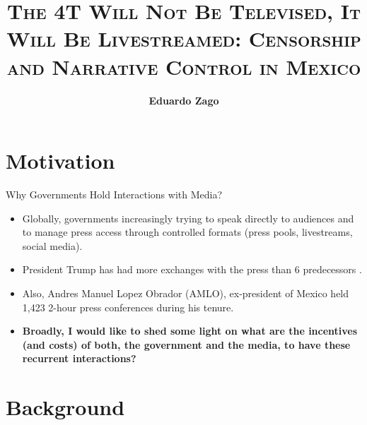 \documentclass[10pt,aspectratio=169]{beamer}
\title{\Large\textsc{The 4T Will Not Be Televised, It Will Be Livestreamed: Censorship and Narrative Control in Mexico}}
\author[Zago] %
{\textbf{Eduardo Zago}\inst{1}  \vspace{10pt}}
\institute []%
{  \inst{1}   PhD Student NYU Politics}
\date{\textsc{}}
\begin{document}
\maketitle









\section{Motivation}


\begin{frame}{Why Governments Hold Interactions with Media?}
\begin{itemize}
  \setlength\itemsep{1em}

    \item Globally, governments increasingly trying to speak \alert{directly} to audiences and to \alert{manage press access} through controlled formats (press pools, livestreams, social media).
    \item President Trump has had more exchanges with the press than 6 predecessors {\footnotesize\color{gray}\citep{Trump100Days}}. 
    \item Also, Andres Manuel Lopez Obrador (AMLO), ex-president of Mexico held 1,423 2-hour press conferences during his tenure.
    \item \textbf{Broadly, I would like to shed some light on what are the incentives (and costs) of both, the government and the media, to have these recurrent interactions?}

    
\end{itemize}
\end{frame}


\section{Background}
\end{document}
